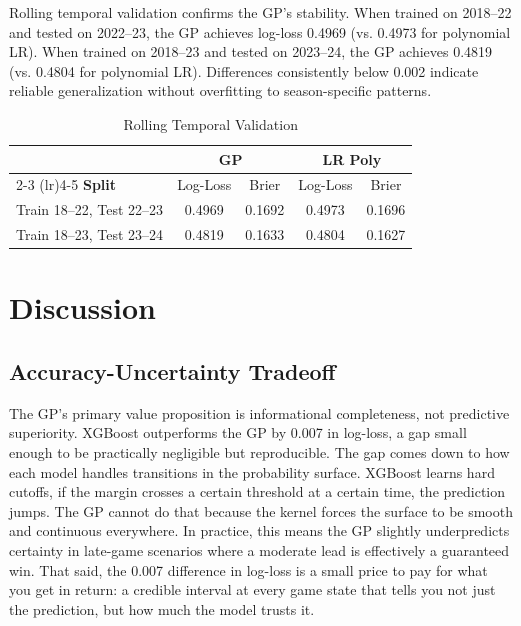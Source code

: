 \documentclass[conference]{IEEEtran}
\begin{document}
Rolling temporal validation confirms the GP's stability. When trained on 2018--22 and tested on 2022--23, the GP achieves log-loss 0.4969 (vs. 0.4973 for polynomial LR). When trained on 2018--23 and tested on 2023--24, the GP achieves 0.4819 (vs. 0.4804 for polynomial LR). Differences consistently below 0.002 indicate reliable generalization without overfitting to season-specific patterns.

\begin{table}[t]
\centering
\caption{Rolling Temporal Validation}
\label{tab:temporal}
\begin{tabular}{lcccc}
\toprule
& \multicolumn{2}{c}{\textbf{GP}} & \multicolumn{2}{c}{\textbf{LR Poly}} \\
\cmidrule(lr){2-3} \cmidrule(lr){4-5}
\textbf{Split} & Log-Loss & Brier & Log-Loss & Brier \\
\midrule
Train 18--22, Test 22--23 & 0.4969 & 0.1692 & 0.4973 & 0.1696 \\
Train 18--23, Test 23--24 & 0.4819 & 0.1633 & 0.4804 & 0.1627 \\
\bottomrule
\end{tabular}
\end{table}

\section{Discussion}

\subsection{Accuracy-Uncertainty Tradeoff}

The GP's primary value proposition is informational completeness, not predictive superiority. XGBoost outperforms the GP by 0.007 in log-loss, a gap small enough to be practically negligible but reproducible. The gap comes down to how each model handles transitions in the probability surface. XGBoost learns hard cutoffs, if the margin crosses a certain threshold at a certain time, the prediction jumps. The GP cannot do that because the kernel forces the surface to be smooth and continuous everywhere. In practice, this means the GP slightly underpredicts certainty in late-game scenarios where a moderate lead is effectively a guaranteed win. That said, the 0.007 difference in log-loss is a small price to pay for what you get in return: a credible interval at every game state that tells you not just the prediction, but how much the model trusts it.
\end{document}
